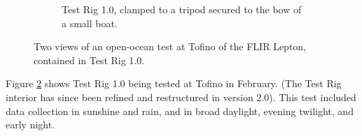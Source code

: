 \begin{figure}
\begin{subfigure}{.35\textwidth}
  \caption{Test Rig 1.0, clamped to a tripod secured to the bow of a small boat.}
  \label{fig:test_rig_1.0_tofino:sub2}
\end{subfigure}
\caption[Test Rig 1.0 open-ocean test.]{Two views of an open-ocean test at Tofino of the FLIR Lepton, contained in Test Rig 1.0.}
\label{fig:test_rig_1.0_tofino}
\end{figure}

Figure \ref{fig:test_rig_1.0_tofino} shows Test Rig 1.0 being tested at Tofino in February. (The Test Rig interior has since been refined and restructured in version 2.0). This test included data collection in sunshine and rain, and in broad daylight, evening twilight, and early night.


